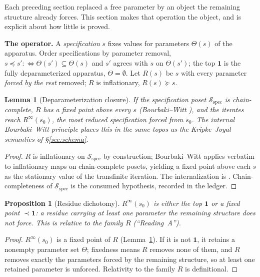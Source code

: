 \documentclass[11pt]{article}
\newtheorem{proposition}{Proposition}
\newtheorem{lemma}{Lemma}
\theoremstyle{definition}
\theoremstyle{remark}
\newcommand{\Sspec}{\mathcal{S}_{\mathrm{spec}}}
\begin{document}
Each preceding section replaced a free parameter by an object the remaining structure already forces.
This section makes that operation the object, and is explicit about how little is proved.

\medskip\noindent\textbf{The operator.} A \emph{specification} $s$ fixes values for parameters
$\Theta(s)$ of the apparatus. Order specifications by parameter removal,
$s \preceq s' :\Longleftrightarrow \Theta(s')\subseteq\Theta(s)$ and $s'$ agrees with $s$ on
$\Theta(s')$; the top $\mathbf{1}$ is the fully deparameterized apparatus, $\Theta=\emptyset$. Let
$R(s)$ be $s$ with every parameter \emph{forced by the rest} removed; $R$ is inflationary,
$R(s)\succeq s$.

\begin{lemma}[Deparameterization closure]\label{lem:bw}
If the specification poset $\Sspec$ is chain-complete, $R$ has a fixed point above every $s$
(Bourbaki--Witt \cite{bourbaki-witt}), and the iterates reach $R^\infty(s_0)$, the most reduced
specification forced from $s_0$. The internal Bourbaki--Witt principle \cite{bw-topos} places this in
the same topos as the Kripke--Joyal semantics of \S\ref{sec:schema}.
\end{lemma}

\begin{proof}
$R$ is inflationary on $\Sspec$ by construction; Bourbaki--Witt applies verbatim to inflationary
maps on chain-complete posets, yielding a fixed point above each $s$ as the stationary value of the
transfinite iteration. The internalization is \cite{bw-topos}. Chain-completeness of $\Sspec$ is the
consumed hypothesis, recorded in the ledger.
\end{proof}

\begin{proposition}[Residue dichotomy]\label{prop:dich}
$R^\infty(s_0)$ is either the top $\mathbf{1}$ or a fixed point $\prec\mathbf{1}$: a \emph{residue}
carrying at least one parameter the remaining structure does not force. This is relative to the family
$R$ (``Reading~A'').
\end{proposition}

\begin{proof}
$R^\infty(s_0)$ is a fixed point of $R$ (Lemma~\ref{lem:bw}). If it is not $\mathbf{1}$, it retains
a nonempty parameter set $\Theta$; fixedness means $R$ removes none of them, and $R$ removes exactly
the parameters forced by the remaining structure, so at least one retained parameter is unforced.
Relativity to the family $R$ is definitional.
\end{proof}
\end{document}
